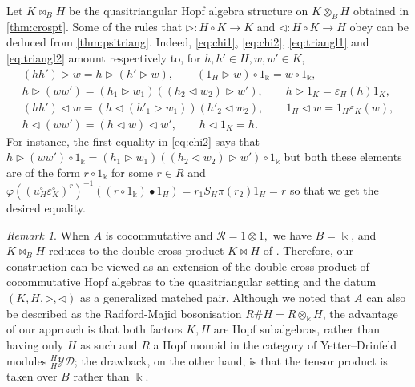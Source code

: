\documentclass[nosumlimits,twoside]{amsart}
\theoremstyle{definition}
\theoremstyle{remark}
\newtheorem{remark}[remark]{\sc Remark}
\newcommand{\Rr}{\mathcal{R}}
\newcommand{\ot}{\otimes}
\begin{document}
Let $K\bowtie_B H$ be the quasitriangular Hopf algebra structure on $K\otimes_B H$ obtained in \cref{thm:crospt}. Some of the rules that $\triangleright:H\circ K\to K$ and $\triangleleft:H\circ K\to H$ obey can be deduced from \cref{thm:psitriang}. Indeed, \eqref{eq:chi1}, \eqref{eq:chi2}, \eqref{eq:triangl1} and
\eqref{eq:triangl2} amount respectively to, for $h,h'\in H,w,w'\in K$,
\begin{gather*}
(hh')\triangleright w
=h\triangleright (h'\triangleright w),\qquad (1_H\triangleright w)\circ 1_\Bbbk=w\circ 1_\Bbbk,\\
h\triangleright(ww')=(h_1\triangleright w_1)((h_2\triangleleft w_2)\triangleright w'),\qquad h\triangleright 1_K=\varepsilon_H(h)1_K,\\
(hh')\triangleleft w=(h\triangleleft(h'_1\triangleright w_1))(h'_2\triangleleft w_2),\qquad 1_H\triangleleft w=1_H\varepsilon_K(w),\\
h\triangleleft(ww')=(h\triangleleft w)\triangleleft w',\qquad h\triangleleft 1_K= h.
\end{gather*}
For instance, the first equality in \eqref{eq:chi2} says that $h\triangleright(ww')\circ 1_\Bbbk=(h_1\triangleright w_1)((h_2\triangleleft w_2)\triangleright w')\circ1_\Bbbk$ but both these elements are of the form $r\circ 1_\Bbbk$ for some $r\in R$ and $\varphi((u^\circ_H\varepsilon^\circ_K)^r)^{-1}((r\circ 1_\Bbbk)\bullet1_H)=r_1S_H\pi(r_2)1_H=r$ so that we get the desired equality.
\begin{remark}
When $A$ is cocommutative and $\Rr=1\ot1,$ we have $B=\Bbbk$, and $K\bowtie_B H$ reduces to the double cross product $K\bowtie H$ of \cite[Theorem 7.2.2]{Majid-book}. Therefore, our construction can be viewed as an extension of the double cross product of cocommutative Hopf algebras to the quasitriangular setting and the datum $(K,H,\triangleright,\triangleleft)$ as a generalized matched pair.
Although we noted that $A$ can also be described as the Radford-Majid bosonisation $R\#H=R\otimes_\Bbbk H$, the advantage of our approach is that both factors $K,H$ are Hopf subalgebras, rather than having only $H$ as such and $R$ a Hopf monoid in the category of Yetter–Drinfeld modules $^H_H\mathcal{YD}$; the drawback, on the other hand, is that the tensor product is taken over $B$ rather than $\Bbbk$.
\end{remark}
\end{document}
